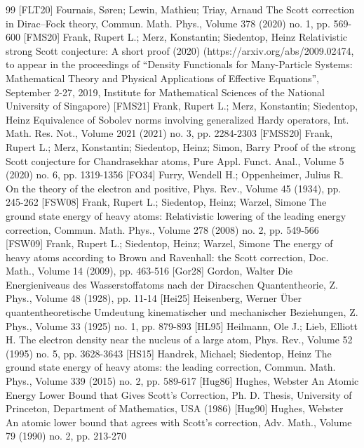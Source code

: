 \documentclass[10pt]{amsart}
\theoremstyle{definition}
\begin{document}
\begin{thebibliography}{99}
 [FLT20] Fournais, Søren; Lewin, Mathieu; Triay, Arnaud The Scott correction in Dirac–Fock theory, Commun. Math. Phys., Volume 378 (2020) no. 1, pp. 569-600
 [FMS20] Frank, Rupert L.; Merz, Konstantin; Siedentop, Heinz Relativistic strong Scott conjecture: A short proof (2020) (https://arxiv.org/abs/2009.02474, to appear in the proceedings of “Density Functionals for Many-Particle Systems: Mathematical Theory and Physical Applications of Effective Equations”, September 2-27, 2019, Institute for Mathematical Sciences of the National University of Singapore)
 [FMS21] Frank, Rupert L.; Merz, Konstantin; Siedentop, Heinz Equivalence of Sobolev norms involving generalized Hardy operators, Int. Math. Res. Not., Volume 2021 (2021) no. 3, pp. 2284-2303
 [FMSS20] Frank, Rupert L.; Merz, Konstantin; Siedentop, Heinz; Simon, Barry Proof of the strong Scott conjecture for Chandrasekhar atoms, Pure Appl. Funct. Anal., Volume 5 (2020) no. 6, pp. 1319-1356
 [FO34] Furry, Wendell H.; Oppenheimer, Julius R. On the theory of the electron and positive, Phys. Rev., Volume 45 (1934), pp. 245-262
 [FSW08] Frank, Rupert L.; Siedentop, Heinz; Warzel, Simone The ground state energy of heavy atoms: Relativistic lowering of the leading energy correction, Commun. Math. Phys., Volume 278 (2008) no. 2, pp. 549-566
 [FSW09] Frank, Rupert L.; Siedentop, Heinz; Warzel, Simone The energy of heavy atoms according to Brown and Ravenhall: the Scott correction, Doc. Math., Volume 14 (2009), pp. 463-516
 [Gor28] Gordon, Walter Die Energieniveaus des Wasserstoffatoms nach der Diracschen Quantentheorie, Z. Phys., Volume 48 (1928), pp. 11-14
 [Hei25] Heisenberg, Werner Über quantentheoretische Umdeutung kinematischer und mechanischer Beziehungen, Z. Phys., Volume 33 (1925) no. 1, pp. 879-893
 [HL95] Heilmann, Ole J.; Lieb, Elliott H. The electron density near the nucleus of a large atom, Phys. Rev., Volume 52 (1995) no. 5, pp. 3628-3643
 [HS15] Handrek, Michael; Siedentop, Heinz The ground state energy of heavy atoms: the leading correction, Commun. Math. Phys., Volume 339 (2015) no. 2, pp. 589-617
 [Hug86] Hughes, Webster An Atomic Energy Lower Bound that Gives Scott’s Correction, Ph. D. Thesis, University of Princeton, Department of Mathematics, USA (1986)
 [Hug90] Hughes, Webster An atomic lower bound that agrees with Scott’s correction, Adv. Math., Volume 79 (1990) no. 2, pp. 213-270

\end{thebibliography}
\end{document}
